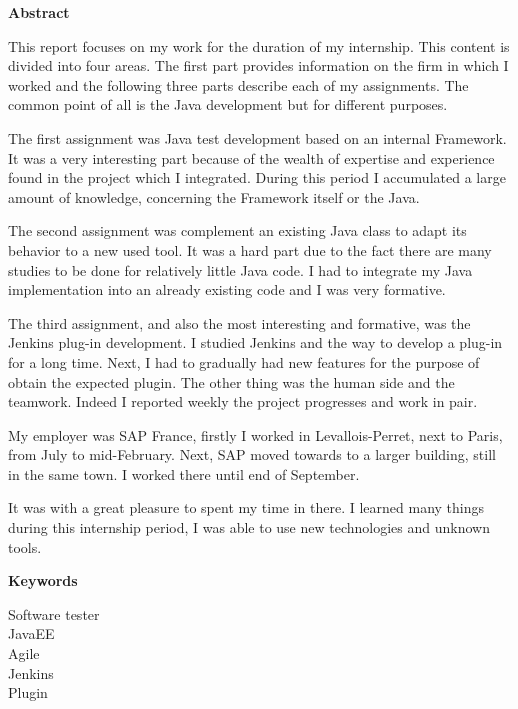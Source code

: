 \clearpage
\ifodd\thepage\hbox{}\newpage\else\fi%
\parindent=0pt

\restoregeometry

\thispagestyle{empty}

%
\begin{center}
{\Large \textbf{Abstract}}
\end{center}



This report focuses on my work for the duration of my internship. This content is divided into four areas.
The first part provides information on the firm in which I worked and the following three parts describe each of my assignments.
The common point of all is the Java development but for different purposes.




The first assignment was Java test development based on an internal Framework.
It was a very interesting part because of the wealth of expertise and experience found in the project which I integrated.
During this period I accumulated a large amount of knowledge, concerning the Framework itself or the Java.

The second assignment was complement an existing Java class to adapt its behavior to a new used tool.
It was a hard part due to the fact there are many studies to be done for relatively little Java code.
I had to integrate my Java implementation into an already existing code and I was very formative.

The third assignment, and also the most interesting and formative, was the Jenkins plug-in development.
I studied Jenkins and the way to develop a plug-in for a long time. Next, I had to gradually had new features for the purpose of obtain the expected plugin.
The other thing was the human side and the teamwork. Indeed I reported weekly the project progresses and work in pair.



My employer was SAP France, firstly I worked in Levallois-Perret, next to Paris, from July to mid-February. Next, SAP moved towards to a larger building, still in the same town. I worked there until end of September.


It was with a great pleasure to spent my time in there. I learned many things during this internship period, I was able to use new technologies and unknown tools. 



\hrulefill
\begin{center}
{\Large \textbf{Keywords}}
\end{center}
\hrulefill





\begin{center}
Software tester\\
JavaEE\\
Agile\\
Jenkins\\
Plugin\\
\end{center}
